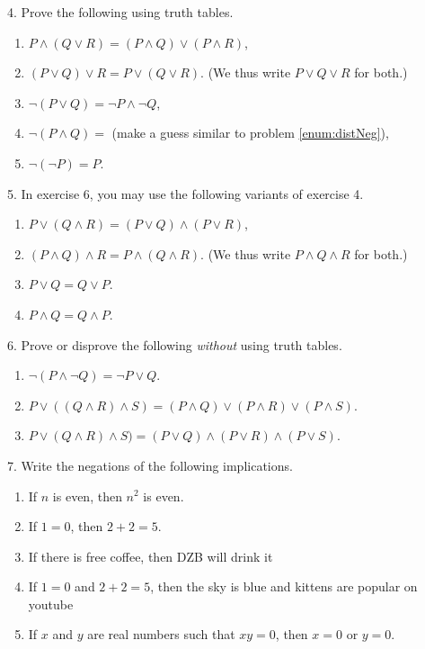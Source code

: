 \documentclass[12pt, reqno]{amsart}
\begin{document}
4. Prove the following using truth tables.
\vspace{10pt}
\begin{enumerate}
\item $P \wedge(  Q\vee R) = (P\wedge Q) \vee (P \wedge R)$,
\item $(P \vee Q) \vee R = P \vee (Q \vee R)$. (We thus write $P \vee Q \vee R$ for both.)
\item \label{enum:distNeg} $\neg (P \vee Q) = \neg P \wedge \neg Q$,
\item $\neg (P \wedge Q) =$ (make a guess similar to problem \ref{enum:distNeg}),
\item $\neg (\neg P) = P$.
\end{enumerate}
\vspace{20pt}

\newpage

5. In exercise 6, you may use the following variants of exercise 4.
\vspace{10pt}
\begin{enumerate}
\item $P \vee(  Q\wedge R) = (P\vee Q) \wedge (P \vee R)$,
\item $(P \wedge Q) \wedge R = P \wedge (Q \wedge R)$. (We thus write $P \wedge Q \wedge R$ for both.)
\item $P \vee Q = Q \vee P$.
\item $P \wedge Q = Q \wedge P$.
\end{enumerate}
\vspace{20pt}

6. Prove or disprove the following \emph{without} using truth tables. 
\vspace{10pt}
\begin{enumerate}
\item $\neg(P \wedge \neg Q) = \neg P \vee Q$.
\item $P \vee ((Q \wedge R) \wedge S) = (P \wedge Q) \vee (P \wedge R)
  \vee (P \wedge S)$.
\item $P \vee (Q \wedge R) \wedge S) = (P \vee Q) \wedge (P \vee R)
  \wedge (P \vee S)$.

\end{enumerate}
\vspace{20pt}

7. Write the negations of the following implications.
\vspace{10pt}
\begin{enumerate}
\item If $n$ is even, then $n^2$ is even.
\item If $1 = 0$, then $2 + 2 = 5$.
\item If there is free coffee, then DZB will drink it
\item If $1 = 0$ and $2 + 2 = 5$, then the sky is blue and kittens are popular on youtube
\item If $x$ and $y$ are real numbers such that $xy = 0$, then $x = 0$ or $y = 0$.
\end{enumerate}
\vspace{20pt}
\end{document}
